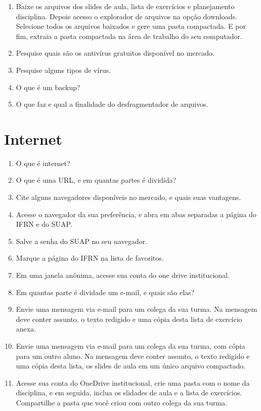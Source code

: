 \documentclass[11pt]{article}
\begin{document}
\begin{enumerate}
		\item Baixe os arquivos dos slides de aula, lista de exercícios e planejamento disciplina. Depois acesso o explorador de arquivos na opção downloads. Selecione todos os arquivos baixados e gere uma pasta compactada. E por fim, extraia a pasta compactada na área de trabalho do seu computador.
		\item Pesquise quais são os antivírus gratuitos disponível no mercado.
		\item Pesquise alguns tipos de vírus.
		\item O que é um backup?
		\item O que faz e qual a finalidade do desfragmentador de arquivos. 
	\end{enumerate}
	
	\section{Internet}
	
	\begin{enumerate}
		\item O que é internet?
		\item O que é uma URL, e em quantas partes é dividida?
		\item Cite alguns navegadores disponíveis no mercado, e quais suas vantagens.
		\item Acesse o navegador da sua preferência, e abra em abas separadas a página do IFRN e do SUAP.
		\item Salve a senha do SUAP no seu navegador.
		\item Marque a página do IFRN na lista de favoritos.
		\item Em uma janela anônima, acesse sua conta do one drive institucional.
		\item Em quantas parte é dividade um e-mail, e quais são elas?
		\item Envie uma mensagem via e-mail para um colega da sua turma. Na mensagem deve conter assunto, o texto redigido e uma cópia desta lista de exercício anexa.
		\item Envie uma mensagem via e-mail para um colega da sua turma, com cópia para um outro aluno. Na mensagem deve conter assunto, o texto redigido e uma cópia desta lista, os slides de aula em um único arquivo compactado.
		\item Acesse sua conta do OneDrive institucional, crie uma pasta com o nome da disciplina, e em seguida, inclua os slidades de aula e a lista de exercícios. Compartilhe a pasta que você criou com outro colega da sua turma.
	\end{enumerate}
\end{document}
